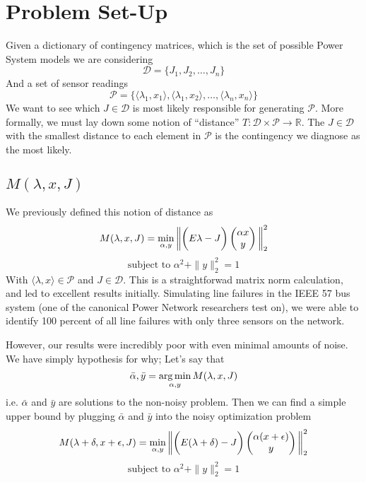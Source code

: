 \section{Problem Set-Up}
Given a dictionary of contingency matrices, which is the set of possible Power System models we are considering
$$ \mathcal{D} =  \{ J_1, J_2, \dots, J_n \} $$
And a set of sensor readings 
$$ \mathcal{P} =  \{ \langle \lambda_1,x_1 \rangle, \langle \lambda_1,x_2 \rangle, \dots, \langle \lambda_n,x_n \rangle \} $$
We want to see which $J \in \mathcal{D}$ is most likely responsible for generating $\mathcal{P}$. More formally, 
we must lay down some notion of ``distance'' $T: \mathcal{D} \times \mathcal{P} \rightarrow \mathbb{R}$. The $J \in \mathcal{D}$ with the smallest distance to each element in $\mathcal{P}$ is the contingency we diagnose as the most likely. 
\subsection{$M(\lambda, x, J)$}
We previously defined this notion of distance as
\begin{equation}
M(\lambda, x, J) = \min_{\alpha, y} \bigg{ \| } \bigg{(}E {\lambda} - J\bigg{)}
\begin{pmatrix}
\alpha x \\
y
\end{pmatrix}
     \bigg{ \| }_2^2
\end{equation}
$$ \text{subject to } \alpha^2 + \|y\|_2^2 = 1$$
 With 
$\langle \lambda,x \rangle \in \mathcal{P}$ and $J \in \mathcal{D}$. This is a straightforwad matrix norm calculation, and led to excellent results initially. Simulating line failures in the IEEE 57 bus system (one of the canonical Power Network researchers test on), we were able to identify 100 percent of all line failures with only three sensors on the network. 

However, our results were incredibly poor with even minimal amounts of noise. We have simply hypothesis for why; Let's say that $$\bar{\alpha}, \bar{y} = \operatorname*{arg\,min}_{\alpha,y} M(\lambda, x, J)$$ i.e. $\bar{\alpha}$ and $\bar{y}$ are solutions to the non-noisy problem. 
 Then we can find a simple upper bound by plugging $\bar{\alpha}$ and $\bar{y}$ into the noisy optimization problem
\begin{equation}
M(\lambda + \delta, x + \epsilon, J) = \min_{\alpha, y} \bigg{ \| } \bigg{(}E (\lambda + \delta) - J\bigg{)}
\begin{pmatrix}
\alpha (x + \epsilon) \\
y
\end{pmatrix}
     \bigg{ \| }_2^2
\end{equation}
$$ \text{subject to } \alpha^2 + \|y\|_2^2 = 1$$


